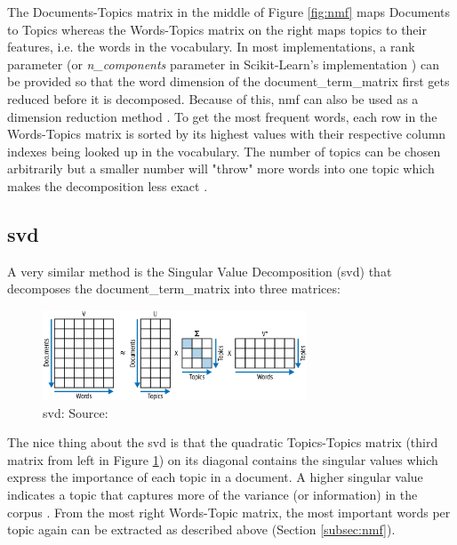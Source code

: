 The Documents-Topics matrix in the middle of Figure \ref{fig:nmf} maps Documents to Topics whereas the Words-Topics matrix on the right maps topics to their features, i.e. the words in the \gls{vocabulary}.
In most implementations, a rank parameter (or \emph{n\_components} parameter in Scikit-Learn's implementation \cite{nmf-implementation}) can be provided so that the word dimension of the \gls{document_term_matrix} first gets reduced before it is decomposed.
Because of this, \gls{nmf} can also be used as a dimension reduction method \cite{nmf-implementation}.
To get the most frequent words, each row in the Words-Topics matrix is sorted by its highest values with their respective column indexes being looked up in the \gls{vocabulary}.
The number of topics can be chosen arbitrarily but a smaller number will "throw" more words into one topic which makes the decomposition less exact \cite{blueprints}.

\subsection{\gls{svd}}\label{subsec:svd}
A very similar method is the Singular Value Decomposition (\gls{svd}) that decomposes the \gls{document_term_matrix} into three matrices:

\begin{figure}[H]   %
    \centering
    \includegraphics[width=0.70\textwidth]{Assets/svd}
    \caption{\gls{svd}: Source: \cite{blueprints}}
    \label{fig:svd}
\end{figure}

The nice thing about the \gls{svd} is that the quadratic Topics-Topics matrix (third matrix from left in Figure \ref{fig:svd}) on its diagonal contains the singular values which express the importance of each topic in a document.
A higher singular value indicates a topic that captures more of the variance (or information) in the corpus \cite{blueprints}.
From the most right Words-Topic matrix, the most important words per topic again can be extracted as described above (Section \ref{subsec:nmf}).

